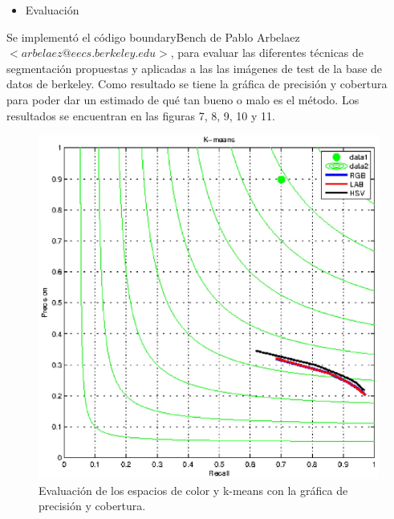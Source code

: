 \documentclass[10pt,twocolumn,letterpaper]{article}
\begin{document}
\begin{itemize}
 \item Evaluación
\end{itemize}
Se implementó el código boundaryBench de Pablo Arbelaez $<arbelaez@eecs.berkeley.edu>$\cite{5557884}, para evaluar las diferentes técnicas de segmentación propuestas y 
aplicadas a las las imágenes de test de la base de datos de berkeley. Como resultado se tiene la gráfica de precisión y cobertura para poder dar un estimado de qué tan bueno
o malo es el método. Los resultados se encuentran en las figuras 7, 8, 9, 10 y 11.
\begin{figure}[h]
\begin{center}
   \includegraphics[scale=0.4]{K-meansiso.eps}
\end{center}
   \caption{Evaluación de los espacios de color y k-means con la gráfica de precisión y cobertura.}
\label{fig:long}
\label{fig:onecol}
\end{figure}
\end{document}
